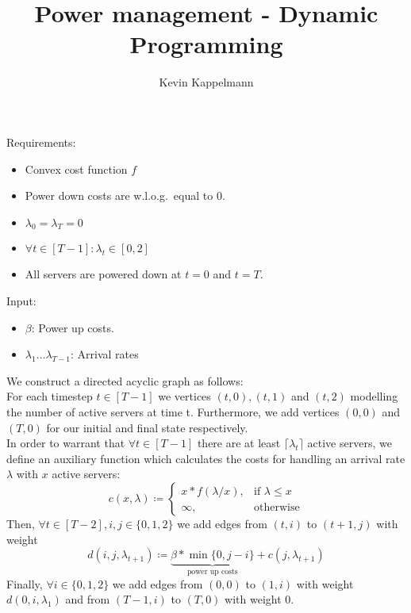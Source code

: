 \documentclass[hidelinks]{article}
\title{Power management - Dynamic Programming}
\author{Kevin Kappelmann\\
  \multicolumn{1}{p{.7\textwidth}}{\centering\emph{Chair for Theoretical Computer Science,\\
  Technical University of Munich}}}
\theoremstyle{plain}
\theoremstyle{definition}
\theoremstyle{rem}
\begin{document}

\begin{sloppypar}
Requirements:
\begin{itemize}
	\item Convex cost function $f$
	\item Power down costs are w.l.o.g.\ equal to 0.
	\item $\lambda_0=\lambda_T=0$
	\item $\forall t\in[T-1]:\lambda_t\in[0,2]$
	\item All servers are powered down at $t=0$ and $t=T$.
\end{itemize}
Input:
\begin{itemize}
	\item $\beta$: Power up costs.
	\item $\lambda_1\ldots\lambda_{T-1}$: Arrival rates
\end{itemize}
We construct a directed acyclic graph as follows:\\
For each timestep $t\in[T-1]$ we vertices $(t,0),(t,1)$ and $(t,2)$ modelling the number of active servers at time t. Furthermore, we add vertices $(0,0)$ and $(T,0)$ for our initial and final state respectively.\\
In order to warrant that $\forall t\in[T-1]$ there are at least $\lceil\lambda_t\rceil$ active servers, we define an auxiliary function which calculates the costs for handling an arrival rate $\lambda$ with $x$ active servers:
\begin{equation}
	c(x,\lambda)\coloneqq\begin{cases}
	  x*f(\lambda/x), & \text{if $\lambda\le x$}\\
	  \infty, & \text{otherwise}
	  \end{cases}
\end{equation}
Then, $\forall t\in[T-2],i,j\in\{0,1,2\}$ we add edges from $(t,i)$ to $(t+1,j)$ with weight
\begin{equation}
	d(i,j,\lambda_{t+1})\coloneqq\underbrace{\beta*\min\{0,j-i\}}_{\text{power up costs}}+c(j,\lambda_{t+1})
\end{equation}
Finally, $\forall i\in\{0,1,2\}$ we add edges from $(0,0)$ to $(1,i)$ with weight $d(0,i,\lambda_1)$ and from $(T-1,i)$ to $(T,0)$ with weight 0.
\begin{figure}[H]
\centering
{}
\end{figure}
\end{sloppypar}
\end{document}
